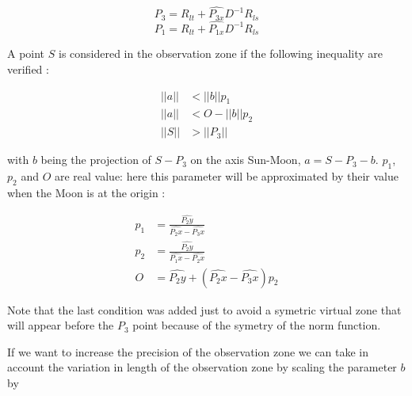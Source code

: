 \documentclass{article} %
\begin{document}
		$$
		\begin{equation}
			P_3=R_{lt}+\hat{P_{3x}}D^{-1}R_{ls} 
		\end{equation}
		$$
		$$
		\begin{equation}
			P_1=R_{lt}+\hat{P_{1x}}D^{-1}R_{ls} 
		\end{equation}
		$$
		
		A point $S$ is considered in the observation zone if the following inequality are verified : 
		
		$$
		\begin{equation}
			\begin{align}
				||a||&<||b||p_1\\
				||a||&<O-||b||p_2\\
				||S||&>||P_3||
			\end{align}	
		\end{equation}
		$$
		
		
		with $b$ being the projection of $S-P_3$ on the axis Sun-Moon, $a=S-P_3-b$. $p_1$, $p_2$ and $O$ are real value: here this parameter will be approximated by their value when the Moon is at the origin :
		
		
		$$
		\begin{align}
			p_1&=\frac{\hat{P_2y}}{\hat{P_2x}-\hat{P_3x}}\\
			p_2&=\frac{\hat{P_2y}}{\hat{P_1x}-\hat{P_2x}}\\
			O&=\hat{P_2y}+(\hat{P_2x}-\hat{P_3x})p_2
		\end{align}	
		$$ 
		
		Note that the last condition was added just to avoid a symetric virtual zone that will appear before the $P_3$ point because of the symetry of the norm function.
		
		
		
		If we want to increase the precision of the observation zone we can take in account the variation in length of the observation zone by scaling the parameter $b$ by
		
\end{document}
